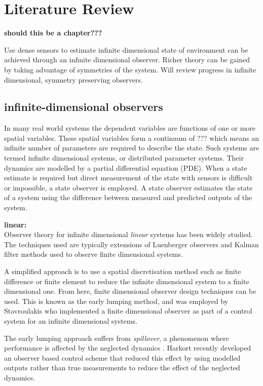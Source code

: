\section{Literature Review}
\textbf{should this be a chapter???}

Use dense sensors to estimate infinite dimensional state of environment can be achieved through an infinite dimensional observer. Richer theory can be gained by taking advantage of symmetries of the system. Will review progress in infinite dimensional, symmetry preserving observers.

\subsection{infinite-dimensional observers}
In many real world systems the dependent variables are functions of one or more spatial variables. These spatial variables form a continuum of ??? which means an infinite number of parameters are required to describe the state. Such systems are termed infinite dimensional systems, or distributed parameter systems. Their dynamics are modelled by a partial differential equation (PDE). When a state estimate is required but direct measurement of the state with sensors is difficult or impossible, a state observer is employed. A state observer estimates the state of a system using the difference between measured and predicted outputs of the system.

\textbf{linear:}\\
Observer theory for infinite dimensional \textit{linear} systems has been widely studied. The techniques used are typically extensions of Luenberger observers and Kalman filter methods used to observe finite dimensional systems.

A simplified approach is to use a spatial discretisation method such as finite difference or finite element to reduce the infinite dimensional system to a finite dimensional one. From here, finite dimensional observer design techniques can be used. This is known as the early lumping method, and was employed by Stavroulakis \cite{stavroulakis1973design} who implemented a finite dimensional observer as part of a control system for an infinite dimensional systems.

The early lumping approach suffers from \textit{spillover}, a phenomenon where performance is affected by the neglected dynamics \cite{meirovitch1983problem}. Harkort \cite{harkort2011finite} recently developed an observer based control scheme that reduced this effect by using modelled outputs rather than true measurements to reduce the effect of the neglected dynamics.

